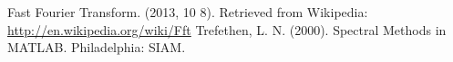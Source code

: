 
\begin{thebibliography}{9}
	Fast Fourier Transform. (2013, 10 8). Retrieved from Wikipedia: \url{http://en.wikipedia.org/wiki/Fft}
	Trefethen, L. N. (2000). Spectral Methods in MATLAB. Philadelphia: SIAM.
\end{thebibliography}